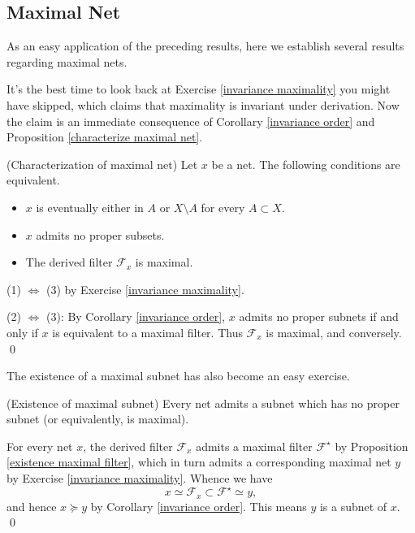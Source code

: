 \documentclass{report}
\begin{document}
\subsection{Maximal Net}

As an easy application of the preceding results, here we establish several results regarding maximal nets.

\begin{rem}
    It's the best time to look back at Exercise \ref{invariance maximality} you might have skipped, which claims that maximality is invariant under derivation. Now the claim is an immediate consequence of Corollary \ref{invariance order} and Proposition \ref{characterize maximal net}.
\end{rem}

\begin{thm}\label{characterize maximal net} (Characterization of maximal net)
    Let \( x \) be a net. The following conditions are equivalent.
    \begin{itemize}
        \item[(1)] \( x \) is eventually either in \( A \) or \( X \setminus A \) for every \( A \subset X \).
        \item[(2)] \( x \) admits no proper subsets.
        \item[(3)] The derived filter \( \mathscr{F}_x \) is maximal.
    \end{itemize}
\end{thm}
\begin{prf}
    (1) \( \iff  \) (3) by Exercise \ref{invariance maximality}.

    (2) \( \iff  \) (3): By Corollary \ref{invariance order}, \( x \) admits no proper subnets if and only if \( x \) is equivalent to a maximal filter.
    Thus \( \mathscr{F}_x \) is maximal, and conversely.
    \qed\end{prf}

The existence of a maximal subnet has also become an easy exercise.
\begin{cor} (Existence of maximal subnet)
    Every net admits a subnet which has no proper subnet (or equivalently, is maximal).
\end{cor}
\begin{prf}
    For every net \( x \), the derived filter \( \mathscr{F}_x \) admits a maximal filter \( \mathscr{F}^{\star} \) by Proposition \ref{existence maximal filter}, which in turn admits a corresponding maximal net \( y \) by Exercise \ref{invariance maximality}. Whence we have
    \[
        x \simeq \mathscr{F}_x \subset \mathscr{F}^{\star} \simeq y,
    \]
    and hence \( x \succeq y \) by Corollary \ref{invariance order}. This means \( y \) is a subnet of \( x \).
    \qed\end{prf}
\end{document}
